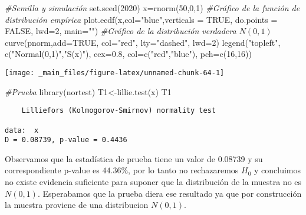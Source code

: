 \documentclass[
  a4paper,
  oneside,
  openany]{book}
\newenvironment{Shaded}{\begin{snugshade}}{\end{snugshade}}
\newcommand{\AttributeTok}[1]{\textcolor[rgb]{0.77,0.63,0.00}{#1}}
\newcommand{\CommentTok}[1]{\textcolor[rgb]{0.56,0.35,0.01}{\textit{#1}}}
\newcommand{\ConstantTok}[1]{\textcolor[rgb]{0.00,0.00,0.00}{#1}}
\newcommand{\DecValTok}[1]{\textcolor[rgb]{0.00,0.00,0.81}{#1}}
\newcommand{\FloatTok}[1]{\textcolor[rgb]{0.00,0.00,0.81}{#1}}
\newcommand{\FunctionTok}[1]{\textcolor[rgb]{0.00,0.00,0.00}{#1}}
\newcommand{\NormalTok}[1]{#1}
\newcommand{\OtherTok}[1]{\textcolor[rgb]{0.56,0.35,0.01}{#1}}
\newcommand{\StringTok}[1]{\textcolor[rgb]{0.31,0.60,0.02}{#1}}
\begin{document}
\begin{Shaded}
\begin{Highlighting}[]
\CommentTok{\#Semilla y simulación}
\FunctionTok{set.seed}\NormalTok{(}\DecValTok{2020}\NormalTok{)}
\NormalTok{x}\OtherTok{=}\FunctionTok{rnorm}\NormalTok{(}\DecValTok{50}\NormalTok{,}\DecValTok{0}\NormalTok{,}\DecValTok{1}\NormalTok{)}
\CommentTok{\#Gráfico de la función de distribución empírica}
\FunctionTok{plot.ecdf}\NormalTok{(x,}\AttributeTok{col=}\StringTok{"blue"}\NormalTok{,}\AttributeTok{verticals =} \ConstantTok{TRUE}\NormalTok{, }\AttributeTok{do.points =} \ConstantTok{FALSE}\NormalTok{, }\AttributeTok{lwd=}\DecValTok{2}\NormalTok{, }\AttributeTok{main=}\StringTok{""}\NormalTok{)}
\CommentTok{\#Gráfico de la distribución verdadera $N(0,1)$}
\FunctionTok{curve}\NormalTok{(pnorm,}\AttributeTok{add=}\ConstantTok{TRUE}\NormalTok{, }\AttributeTok{col=}\StringTok{"red"}\NormalTok{, }\AttributeTok{lty=}\StringTok{"dashed"}\NormalTok{, }\AttributeTok{lwd=}\DecValTok{2}\NormalTok{)}
\FunctionTok{legend}\NormalTok{(}\StringTok{"topleft"}\NormalTok{, }\FunctionTok{c}\NormalTok{(}\StringTok{"Normal(0,1)"}\NormalTok{,}\StringTok{"S(x)"}\NormalTok{), }\AttributeTok{cex=}\FloatTok{0.8}\NormalTok{, }\AttributeTok{col=}\FunctionTok{c}\NormalTok{(}\StringTok{"red"}\NormalTok{,}\StringTok{"blue"}\NormalTok{), }\AttributeTok{pch=}\FunctionTok{c}\NormalTok{(}\DecValTok{16}\NormalTok{,}\DecValTok{16}\NormalTok{))}
\end{Highlighting}
\end{Shaded}

\begin{center}\texttt{[image: \_main\_files/figure-latex/unnamed-chunk-64-1]} \end{center}

\begin{Shaded}
\begin{Highlighting}[]
\CommentTok{\#Prueba}
\FunctionTok{library}\NormalTok{(nortest) }
\NormalTok{T1}\OtherTok{\textless{}{-}}\FunctionTok{lillie.test}\NormalTok{(x)}
\NormalTok{T1}
\end{Highlighting}
\end{Shaded}

\begin{verbatim}
    Lilliefors (Kolmogorov-Smirnov) normality test

data:  x
D = 0.08739, p-value = 0.4436
\end{verbatim}

Observamos que la estadística de prueba tiene un valor de 0.08739 y su correspondiente p-value es \(44.36\%\), por lo tanto no rechazaremos \(H_0\) y concluimos no existe evidencia suficiente para suponer que la distribución de la muestra no es \(N(0,1)\). Esperabamos que la prueba diera ese resultado ya que por construcción la muestra proviene de una distribucion \(N(0,1)\).
\end{document}
